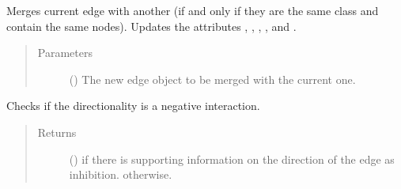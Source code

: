 \documentclass[letterpaper,10pt,english]{sphinxmanual}
\begin{document}
\begin{fulllineitems}
\begin{fulllineitems}
\begin{quote}
\begin{description}
\end{description}\end{quote}

\end{fulllineitems}


\begin{fulllineitems}
\label{\detokenize{main:pypath.main.Direction.merge}}
Merges current edge with another (if and only if they are the
same class and contain the same nodes). Updates the attributes
, , ,
,  and
.
\begin{quote}\begin{description}
\item[{Parameters}] \leavevmode
{} ({\hyperref[\detokenize{main:pypath.main.Direction}]{}}) \textendash{} The new edge object to be merged with the current one.

\end{description}\end{quote}

\end{fulllineitems}


\begin{fulllineitems}
\label{\detokenize{main:pypath.main.Direction.negative_reverse}}
Checks if the  directionality is a negative
interaction.
\begin{quote}\begin{description}
\item[{Returns}] \leavevmode
() \textendash{}  if there is supporting information on
the  direction of the edge as inhibition.
 otherwise.

\end{description}\end{quote}


\end{fulllineitems}
\end{fulllineitems}
\end{document}
